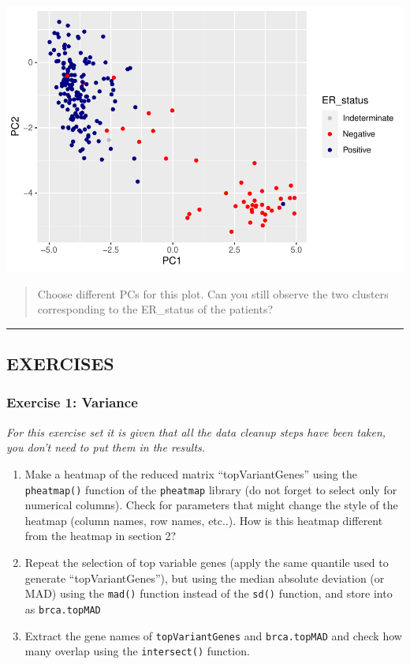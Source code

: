 \documentclass[
]{book}
\begin{document}
\includegraphics{_main_files/figure-latex/unnamed-chunk-85-1.pdf}

\begin{quote}
Choose different PCs for this plot. Can you still observe the two clusters corresponding to the ER\_status of the patients?
\end{quote}

\begin{center}\rule{0.5\linewidth}{0.5pt}\end{center}

\hypertarget{exercises-1}{%
\subsection{EXERCISES}\label{exercises-1}}

\hypertarget{exercise-1-variance}{%
\subsubsection{Exercise 1: Variance}\label{exercise-1-variance}}

\emph{For this exercise set it is given that all the data cleanup steps have been taken, you don't need to put them in the results.}

\begin{enumerate}
\def\labelenumi{\arabic{enumi}.}
\item
  Make a heatmap of the reduced matrix ``topVariantGenes'' using the \texttt{pheatmap()} function of the \texttt{pheatmap} library (do not forget to select only for numerical columns). Check for parameters that might change the style of the heatmap (column names, row names, etc..). How is this heatmap different from the heatmap in section 2?
\item
  Repeat the selection of top variable genes (apply the same quantile used to generate ``topVariantGenes''), but using the median absolute deviation (or MAD) using the \texttt{mad()} function instead of the \texttt{sd()} function, and store into as \texttt{brca.topMAD}
\item
  Extract the gene names of \texttt{topVariantGenes} and \texttt{brca.topMAD} and check how many overlap using the \texttt{intersect()} function.
\end{enumerate}
\end{document}
